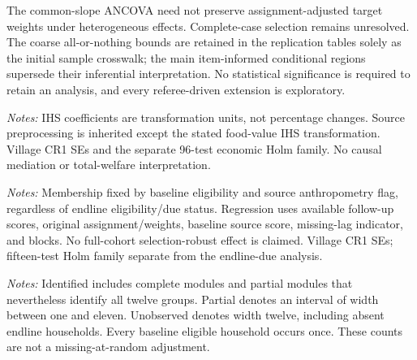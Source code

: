\documentclass[11pt]{article}
\begin{document}
The common-slope ANCOVA need not preserve assignment-adjusted target weights under heterogeneous effects. Complete-case selection remains unresolved. The coarse all-or-nothing bounds are retained in the replication tables solely as the initial sample crosswalk; the main item-informed conditional regions supersede their inferential interpretation. No statistical significance is required to retain an analysis, and every referee-driven extension is exploratory.


\begin{table}[p]
\centering\caption{Source economic outcomes: exploratory assignment regressions}\label{tab:secondary}
\resizebox{\textwidth}{!}{}
\begin{minipage}{\textwidth}\footnotesize\emph{Notes:} IHS coefficients are transformation units, not percentage changes. Source preprocessing is inherited except the stated food-value IHS transformation. Village CR1 SEs and the separate 96-test economic Holm family. No causal mediation or total-welfare interpretation.\end{minipage}
\end{table}
\begin{table}[p]
\centering\caption{Follow-up child scores in the fixed baseline-flagged cohort}\label{tab:baselinechildren}
\resizebox{\textwidth}{!}{}
\begin{minipage}{\textwidth}\footnotesize\emph{Notes:} Membership fixed by baseline eligibility and source anthropometry flag, regardless of endline eligibility/due status. Regression uses available follow-up scores, original assignment/weights, baseline source score, missing-lag indicator, and blocks. No full-cohort selection-robust effect is claimed. Village CR1 SEs; fifteen-test Holm family separate from the endline-due analysis.\end{minipage}
\end{table}


\begin{table}[htbp]
\centering\caption{Food-module information in the baseline eligible cohort}\label{tab:intervalcounts}

\begin{minipage}{\textwidth}\footnotesize
\emph{Notes:} Identified includes complete modules and partial modules that nevertheless identify all twelve groups. Partial denotes an interval of width between one and eleven. Unobserved denotes width twelve, including absent endline households. Every baseline eligible household occurs once. These counts are not a missing-at-random adjustment.
\end{minipage}
\end{table}
\end{document}
